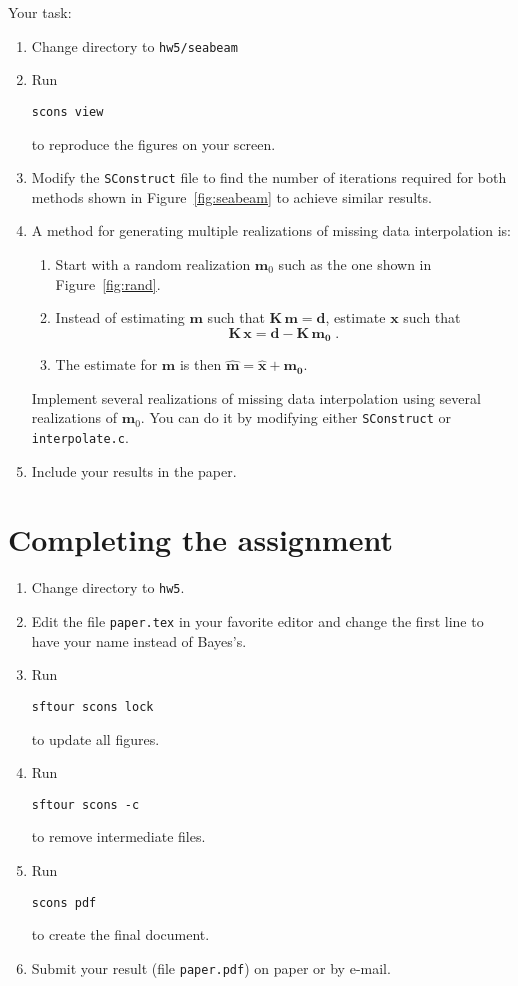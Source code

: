 Your task:
\begin{enumerate}
\item Change directory to \texttt{hw5/seabeam}
\item Run 
\begin{verbatim}
scons view
\end{verbatim}
to reproduce the figures on your screen.
\item Modify the \texttt{SConstruct} file to find the number of iterations required for both methods shown in Figure~\ref{fig:seabeam} to achieve similar results.
\item A method for generating multiple realizations of missing data interpolation is:
\begin{enumerate}
\item Start with a random realization $\mathbf{m}_0$ such as the one shown in Figure~\ref{fig:rand}.
\item Instead of estimating $\mathbf{m}$ such that $\mathbf{K}\,\mathbf{m} = \mathbf{d}$, 
      estimate $\mathbf{x}$ such that 
\[
\mathbf{K}\,\mathbf{x} = \mathbf{d}- \mathbf{K}\,\mathbf{m_0}\;.
\]
\item The estimate for $\mathbf{m}$ is then  $\widehat{\mathbf{m}} = \widehat{\mathbf{x}}+\mathbf{m_0}$.
\end{enumerate}
Implement several realizations of missing data interpolation using
several realizations of $\mathbf{m}_0$. You can do it by modifying
either \texttt{SConstruct} or \texttt{interpolate.c}.
\item Include your results in the paper.
\end{enumerate}


\section{Completing the assignment}

\begin{enumerate}
\item Change directory to \texttt{hw5}.
\item Edit the file \texttt{paper.tex} in your favorite editor and change the
  first line to have your name instead of Bayes's.
\item Run
\begin{verbatim}
sftour scons lock
\end{verbatim}
to update all figures.
\item Run
\begin{verbatim}
sftour scons -c
\end{verbatim}
to remove intermediate files.
\item Run
\begin{verbatim}
scons pdf
\end{verbatim}
to create the final document.
\item Submit your result (file \texttt{paper.pdf}) on paper or by
e-mail.
\end{enumerate}



